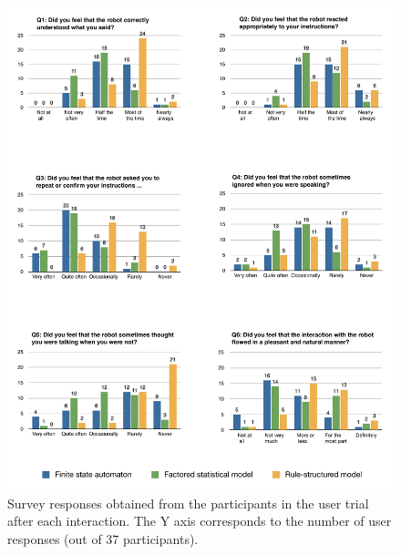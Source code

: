 

\begin{figure}[p]
\begin{center}
\includegraphics[scale=0.5]{imgs/subjective.pdf}
\end{center} 
\caption{Survey responses obtained from the participants in the user trial after each interaction. The Y axis corresponds to the number of user responses (out of 37 participants). }
\label{fig:subjective}
\end{figure}

